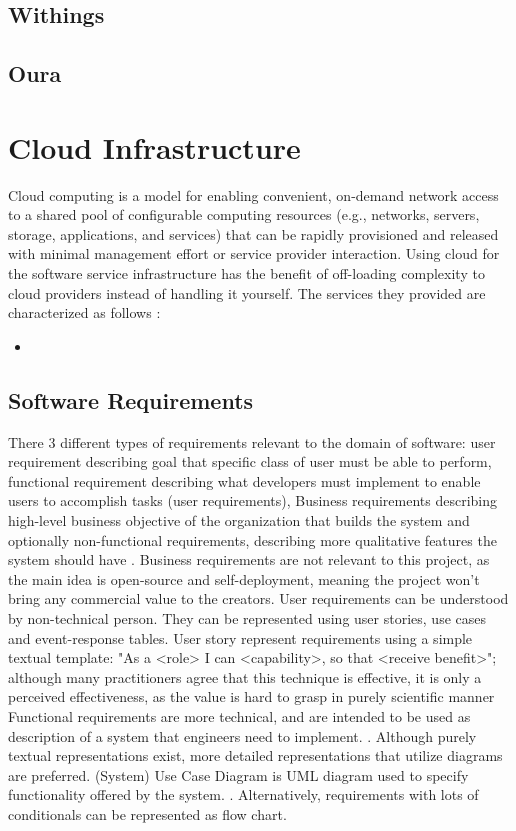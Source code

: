 \subsection{Withings}
\subsection{Oura}
\section{Cloud Infrastructure}
Cloud computing is a model for enabling convenient, on-demand network access to a shared pool of configurable computing
resources (e.g., networks, servers, storage, applications, and services) that can be rapidly provisioned and released with minimal
management effort or service provider interaction. \cite {cloudDef}
Using cloud for the software service infrastructure has the benefit of off-loading complexity to cloud providers instead of handling it yourself. The services they provided are characterized as follows \cite{cloudServicesCategories}: 
\begin{itemize}
    \item 
\end{itemize}
\subsection{Software Requirements}
There 3 different types of requirements relevant to the domain of software: user requirement describing goal that specific class of user must be able to perform, functional requirement describing what developers must implement to enable users to accomplish tasks (user requirements), Business requirements describing high-level business objective of the organization that builds the system and optionally non-functional requirements, describing more qualitative features the system should have \cite{wiegers2013software}. Business requirements are not relevant to this project, as the main idea is open-source and self-deployment, meaning the project won't bring any commercial value to the creators. 
User requirements can be understood by non-technical person. They can be represented using user stories, use cases and event-response tables. User story represent requirements using a simple textual template: "As a <role> I can <capability>, so that <receive benefit>"; although many practitioners agree that this technique is effective, it is only a perceived effectiveness, as the value is hard to grasp in purely scientific manner \cite{userStories}
Functional requirements are more technical, and are intended to be used as description of a system that engineers need to implement. \cite{wiegers2013software}. Although purely textual representations exist, more detailed representations that utilize diagrams are preferred. (System) Use Case Diagram is UML diagram used to specify functionality offered by the system. \cite{malan2001functional}. Alternatively, requirements with lots of conditionals can be represented as flow chart.


